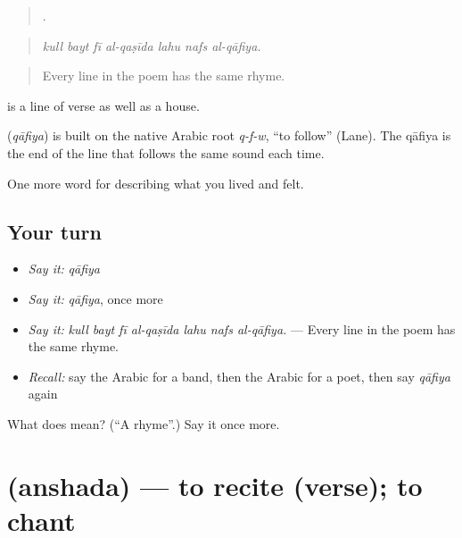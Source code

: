 \begin{quote}
      .
\end{quote}

\begin{quote}
\emph{kull bayt fī al-qaṣīda lahu nafs al-qāfiya.}
\end{quote}

\begin{quote}
Every line in the poem has the same rhyme.
\end{quote}

 is a line of verse as well as a house.

\begin{cousinweb}
\textbf{} (\emph{qāfiya}) is built on the native Arabic root \emph{q-f-w}, \textquotedblleft{}to follow\textquotedblright{} (Lane). The qāfiya is the end of the line that follows the same sound each time.
\end{cousinweb}

\begin{grammarlens}[title={What you've built}]
One more word for describing what you lived and felt.
\end{grammarlens}

\subsection*{Your turn}
\begin{itemize}
\raggedright
  \item \emph{Say it:} \emph{qāfiya}
  \item \emph{Say it:} \emph{qāfiya}, once more
  \item \emph{Say it:} \emph{kull bayt fī al-qaṣīda lahu nafs al-qāfiya.} — Every line in the poem has the same rhyme.
  \item \emph{Recall:} say the Arabic for a band, then the Arabic for a poet, then say \emph{qāfiya} again
\end{itemize}

\begin{tcolorbox}[breakable,colback=teal!4,colframe=teal!35!black,title={Before you move on}]
What does  mean? (\textquotedblleft{}A rhyme\textquotedblright{}.) Say it once more.
\end{tcolorbox}
\section[\texorpdfstring{\ar{أنشد} (anshada)}{أنشد (anshada)}]{ (anshada) — to recite (verse); to chant}

